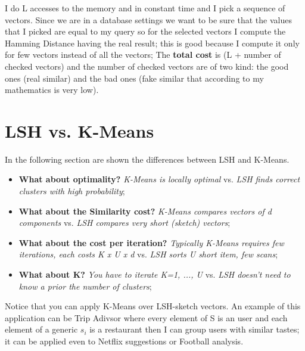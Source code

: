 I do L accesses to the memory and in constant time and I pick a sequence of vectors.\newline
Since we are in a database settings we want to be sure that the values that I picked are equal to my query so for the selected vectors I compute the Hamming Distance having the real result; this is good because I compute it only for few vectors instead of all the vectors;\newline
The \textbf{total cost} is (L + number of checked vectors) and the number of checked vectors are of two kind: the good ones (real similar) and the bad ones (fake similar that according to my mathematics is very low).
\section{LSH vs. K-Means}
In the following section are shown the differences between LSH and K-Means.
\begin{itemize}
    \item \textbf{What about optimality?} \textit{K-Means is locally optimal} vs. \textit{LSH finds correct clusters with high probability};
    \item \textbf{What about the Similarity cost?} \textit{K-Means compares vectors of d components} vs. \textit{LSH compares very short (sketch) vectors};
    \item \textbf{What about the cost per iteration?} \textit{Typically K-Means requires few iterations, each costs K x U x d} vs. \textit{LSH sorts U short item, few scans};
    \item \textbf{What about K?} \textit{You have to iterate K=1, ..., U} vs. \textit{LSH doesn't need to know a prior the number of clusters};
\end{itemize}
Notice that you can apply K-Means over LSH-sketch vectors.\newline
An example of this application can be Trip Adivsor where every element of S is an user and each element of a generic $s_i$ is a restaurant then I can group users with similar tastes; it can be applied even to Netflix suggestions or Football analysis.\newline
